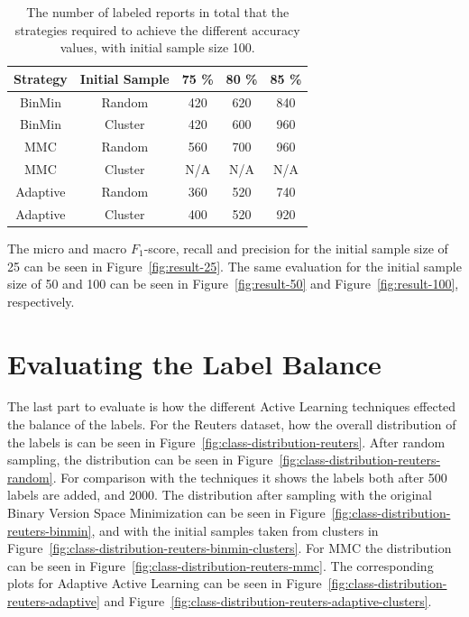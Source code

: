\begin{table}
    \centering
    \begin{tabular}{|ccccc|}
        \hline
        \textbf{Strategy} & \textbf{Initial Sample} & \textbf{75 \%} & \textbf{80 \%} & \textbf{85 \%}\\
        \hline
        BinMin & Random & 420 & 620 & 840\\
        BinMin & Cluster & 420 & 600 & 960\\
        MMC & Random & 560 & 700 & 960\\
        MMC & Cluster & N/A & N/A & N/A\\
        Adaptive & Random & 360 & 520 & 740\\
        Adaptive & Cluster & 400 & 520 & 920\\
        \hline
    \end{tabular}
    \caption{The number of labeled reports in total that the strategies required to achieve the different accuracy values, with initial sample size 100.}
    \label{tab:active-learning-accuracy-100}
\end{table}

The micro and macro $F_1$-score, recall and precision for the initial sample size of 25 can be seen in Figure~\ref{fig:result-25}.
The same evaluation for the initial sample size of 50 and 100 can be seen in Figure~\ref{fig:result-50} and Figure~\ref{fig:result-100}, respectively.


\section{Evaluating the Label Balance}

The last part to evaluate is how the different Active Learning techniques effected the balance of the labels.
For the Reuters dataset, how the overall distribution of the labels is can be seen in Figure~\ref{fig:class-distribution-reuters}.
After random sampling, the distribution can be seen in Figure~\ref{fig:class-distribution-reuters-random}.
For comparison with the techniques it shows the labels both after 500 labels are added, and 2000.
The distribution after sampling with the original Binary Version Space Minimization can be seen in Figure~\ref{fig:class-distribution-reuters-binmin}, and with the initial samples taken from clusters in Figure~\ref{fig:class-distribution-reuters-binmin-clusters}.
For MMC the distribution can be seen in Figure~\ref{fig:class-distribution-reuters-mmc}.
The corresponding plots for Adaptive Active Learning can be seen in Figure~\ref{fig:class-distribution-reuters-adaptive} and Figure~\ref{fig:class-distribution-reuters-adaptive-clusters}.

